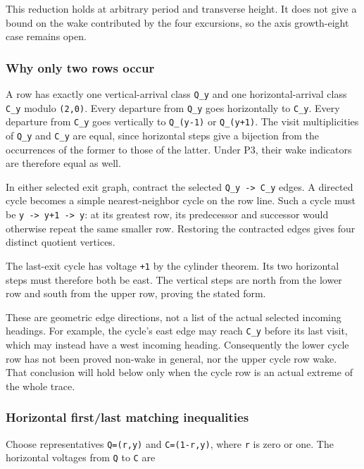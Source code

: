\documentclass[11pt,letterpaper]{article}
\theoremstyle{plain}
\theoremstyle{definition}
\begin{document}
\begin{NoHyper}
This reduction holds at arbitrary period and transverse height. It does not give a bound on the wake contributed by the four excursions, so the axis growth-eight case remains open.

\subsubsection{Why only two rows occur}

A row has exactly one vertical-arrival class \texttt{Q\_y} and one horizontal-arrival class \texttt{C\_y} modulo \texttt{(2,0)}. Every departure from \texttt{Q\_y} goes horizontally to \texttt{C\_y}. Every departure from \texttt{C\_y} goes vertically to \texttt{Q\_(y-1)} or \texttt{Q\_(y+1)}. The visit multiplicities of \texttt{Q\_y} and \texttt{C\_y} are equal, since horizontal steps give a bijection from the occurrences of the former to those of the latter. Under P3, their wake indicators are therefore equal as well.

In either selected exit graph, contract the selected \texttt{Q\_y\ -\textgreater{}\ C\_y} edges. A directed cycle becomes a simple nearest-neighbor cycle on the row line. Such a cycle must be \texttt{y\ -\textgreater{}\ y+1\ -\textgreater{}\ y}: at its greatest row, its predecessor and successor would otherwise repeat the same smaller row. Restoring the contracted edges gives four distinct quotient vertices.

The last-exit cycle has voltage \texttt{+1} by the cylinder theorem. Its two horizontal steps must therefore both be east. The vertical steps are north from the lower row and south from the upper row, proving the stated form.

These are geometric edge directions, not a list of the actual selected incoming headings. For example, the cycle's east edge may reach \texttt{C\_y} before its last visit, which may instead have a west incoming heading. Consequently the lower cycle row has not been proved non-wake in general, nor the upper cycle row wake. That conclusion will hold below only when the cycle row is an actual extreme of the whole trace.

\subsubsection{Horizontal first/last matching inequalities}

Choose representatives \texttt{Q=(r,y)} and \texttt{C=(1-r,y)}, where \texttt{r} is zero or one. The horizontal voltages from \texttt{Q} to \texttt{C} are


\end{NoHyper}
\end{document}
